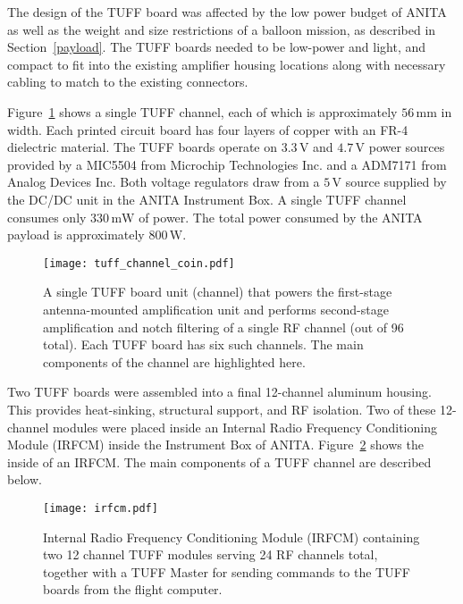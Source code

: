 \documentclass[preprint,12pt]{elsarticle}
\begin{document}
The design of the TUFF board was affected by the low power budget of 
ANITA as well as the weight and size restrictions of a balloon mission, as described in Section~\ref{payload}. 
The TUFF boards needed to be low-power and light, 
and compact to fit into the existing amplifier housing locations 
along with necessary cabling to match to the existing connectors.


Figure~\ref{tuff_channel} shows a single TUFF channel, each of which is approximately $56\,\mathrm{mm}$ in width.
Each printed circuit board has four layers of copper with an FR-4 dielectric material. 
The TUFF boards operate on $3.3\,\mathrm{V}$ and $4.7\,\mathrm{V}$ power sources 
provided by
a MIC5504 from Microchip Technologies Inc. and a ADM7171 from Analog Devices Inc. Both
voltage regulators draw from a $5\,\mathrm{V}$ source 
supplied by the DC/DC unit in the ANITA
Instrument Box. 
A single TUFF channel consumes only $330\,\mathrm{mW}$ of power. 
The total power consumed by the ANITA payload is approximately $800\,\mathrm{W}$. 

\begin{figure}[H]
\centering
\texttt{[image: tuff\_channel\_coin.pdf]}
\caption{A single TUFF board unit (channel) that powers the first-stage antenna-mounted amplification unit 
and performs second-stage amplification and notch filtering of a single RF channel (out of 96 total). 
Each TUFF board has six such channels. The main components of the channel are highlighted here.}
\label{tuff_channel}
\end{figure}

Two TUFF boards were assembled into a final 
12-channel aluminum housing. This provides heat-sinking, structural support, and RF isolation. 
Two of these 12-channel modules were placed inside an 
Internal Radio Frequency Conditioning Module (IRFCM) 
inside the 
Instrument Box of ANITA. Figure~\ref{IRFCM} shows the inside of an IRFCM. 
The main components of a TUFF channel are described below.

\begin{figure}[H]
\centering
\texttt{[image: irfcm.pdf]}
\caption{Internal Radio Frequency Conditioning Module (IRFCM) containing two 12 channel 
TUFF modules serving 24 RF channels total, together with a TUFF Master for sending commands to the TUFF boards from the flight computer.}
\label{IRFCM}
\end{figure}
\end{document}
